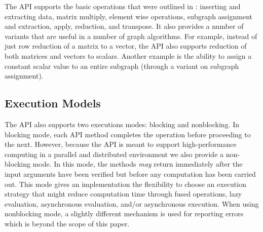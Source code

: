 The API supports the basic operations that were outlined in \cite{mathgraphblas16}:
inserting and extracting data, matrix multiply, element wise operations, subgraph assignment
and extraction, apply, reduction, and transpose.  It also provides a number of
variants that are useful in a number of graph algorithms. For example, instead of
just row reduction of a matrix to a vector, the API also supports reduction of both
matrices and vectors to scalars.  Another example is the ability to assign a constant
scalar value to an entire subgraph (through a variant on subgraph assignment). 

\subsection{Execution Models}

The API also supports two executions modes: blocking and nonblocking. In blocking mode,
each API method completes the operation before proceeding to the next.  However, 
because the API is meant to support high-performance computing in a parallel and
distributed environment we also provide a non-blocking mode.  In this mode, the methods
{\em may} return immediately after the input arguments have been verified but before
any computation has been carried out.  This mode gives an implementation the flexibility
to choose an execution strategy that might reduce computation time through fused
operations, lazy evaluation, asynchronous evaluation, and/or asynchronous execution.  When
using nonblocking mode, a slightly different mechanism is used for reporting errors which
is beyond the scope of this paper.